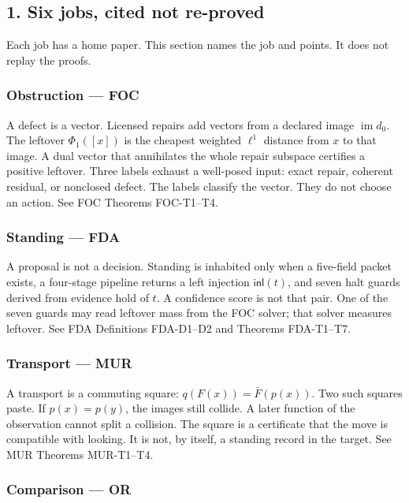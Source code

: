 \documentclass[
  11pt,
]{article}
\begin{document}
\subsection{1. Six jobs, cited not re-proved}\label{six-jobs-cited-not-re-proved}

Each job has a home paper. This section names the job and points. It does not replay the proofs.

\subsubsection{Obstruction --- FOC}\label{obstruction-foc}

A defect is a vector. Licensed repairs add vectors from a declared image \(\operatorname{im}d_0\). The leftover \(\Phi_1([x])\) is the cheapest weighted \(\ell^1\) distance from \(x\) to that image. A dual vector that annihilates the whole repair subspace certifies a positive leftover. Three labels exhaust a well-posed input: exact repair, coherent residual, or nonclosed defect. The labels classify the vector. They do not choose an action. See FOC Theorems FOC-T1--T4.

\subsubsection{Standing --- FDA}\label{standing-fda}

A proposal is not a decision. Standing is inhabited only when a five-field packet exists, a four-stage pipeline returns a left injection \(\mathsf{inl}(t)\), and seven halt guards derived from evidence hold of \(t\). A confidence score is not that pair. One of the seven guards may read leftover mass from the FOC solver; that solver measures leftover. See FDA Definitions FDA-D1--D2 and Theorems FDA-T1--T7.

\subsubsection{Transport --- MUR}\label{transport-mur}

A transport is a commuting square: \(q(F(x))=\bar F(p(x))\). Two such squares paste. If \(p(x)=p(y)\), the images still collide. A later function of the observation cannot split a collision. The square is a certificate that the move is compatible with looking. It is not, by itself, a standing record in the target. See MUR Theorems MUR-T1--T4.

\subsubsection{Comparison --- OR}\label{comparison-or}
\end{document}
